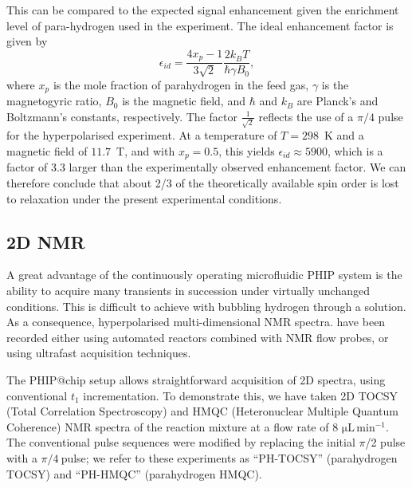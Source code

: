 This can be compared to the expected signal enhancement given the enrichment
level of para-hydrogen used in the experiment. The ideal enhancement factor is
given by
\begin{equation}
	\epsilon_{id} =\frac{4x_p-1}{3\sqrt{2}} \frac{2 k_BT}{\hbar \gamma B_0},
\end{equation}
where $x_p$ is the mole fraction of parahydrogen in the feed gas, $\gamma$ is
the magnetogyric ratio, $B_0$ is the magnetic field, and $\hbar$ and $k_B$ are
Planck's and Boltzmann's constants, respectively.
The factor $\frac{1}{\sqrt{2}}$ reflects the use of a $\pi/4$ pulse for the
hyperpolarised experiment. At a temperature of $T=298$~K
and a magnetic field of $11.7$~T, and with $x_p=0.5$, this yields
$\epsilon_{id}\approx 5900$, which is a factor of 3.3 larger than the
experimentally observed enhancement factor. We can therefore conclude that
about 2/3 of the theoretically available spin order is lost to relaxation under
the present experimental conditions.

\subsection{2D NMR}

A great advantage of the continuously operating microfluidic PHIP system is the
ability to acquire many transients in succession under virtually unchanged
conditions.
This is difficult to achieve with bubbling hydrogen through a solution.
As a consequence, hyperpolarised multi-dimensional NMR spectra\cite{Mishkovsky:2008cl,Giraudeau:2009fn,Roth:2010hk,Lloyd:2012cf,Eshuis:2015ce,Kiryutin:2019hy}. have been recorded
either using automated reactors combined with NMR flow probes,\cite{Lloyd:2012cf,Eshuis:2015ce}
or using ultrafast acquisition techniques\cite{Mishkovsky:2008cl,Giraudeau:2009fn,Kiryutin:2019hy}.

The PHIP@chip setup allows straightforward acquisition of 2D spectra, using
conventional $t_1$ incrementation.
To demonstrate this, we have taken 2D TOCSY (Total Correlation
Spectroscopy) and HMQC (Heteronuclear Multiple Quantum Coherence) NMR spectra
of the reaction mixture at a flow rate of 8 $\mathrm{\mu L\,min^{-1}}$.
The conventional
pulse sequences were modified by replacing the initial \(\pi\)/2 pulse with a
\(\pi/4\ \)pulse; we refer to these experiments as ``PH-TOCSY'' (parahydrogen TOCSY) and
``PH-HMQC'' (parahydrogen HMQC).

